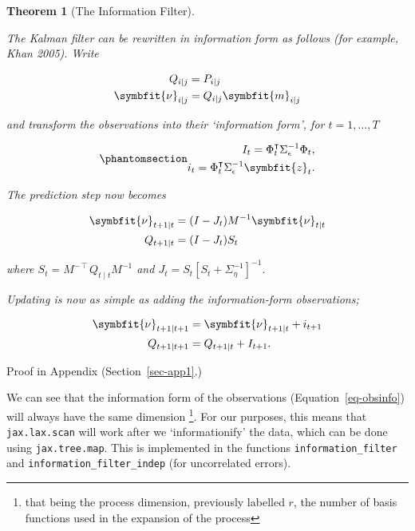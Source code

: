 \documentclass[
]{report}
\newcommand{\bv}[1]{\symbfit{#1}}
\theoremstyle{plain}
\theoremstyle{plain}
\newtheorem{theorem}{Theorem}[section]
\theoremstyle{plain}
\theoremstyle{remark}
\begin{document}
\begin{theorem}[The Information
Filter]\protect\hypertarget{thm-information_filter}{}\label{thm-information_filter}

The Kalman filter can be rewritten in information form as follows (for
example, Khan 2005). Write

\[\begin{split}
Q_{i\mid j} &= P_{i\mid j}\\
\bv\nu_{i\mid j} &= Q_{i\mid j} \bv m_{i\mid j}
\end{split}
\]

and transform the observations into their `information form', for
\(t=1,\dots, T\)

\begin{equation}\phantomsection\label{eq-obsinfo}{\begin{split}
I_{t} = \Phi_{t}^{\intercal} \Sigma_{\epsilon}^{-1}\Phi_{t},\\
i_{t} = \Phi_{t}^{\intercal} \Sigma_{\epsilon}^{-1} \bv z_{t}.
\end{split}
}\end{equation}

The prediction step now becomes

\[\begin{split}
\bv\nu_{t+1\mid t} &= (I-J_t) M^{-1}\bv\nu_{t\mid t}\\
Q_{t+1\mid t} &= (I-J_t) S_{t} 
\end{split}
\]

where \(S_t = M^{-\intercal} Q_{t\mid t} M^{-1}\) and
\(J_t = S_t [S_{t}+\Sigma_{\eta}^{-1}]^{-1}\).

Updating is now as simple as adding the information-form observations;

\[\begin{split}
  \bv\nu_{t+1\mid t+1} &= \bv\nu_{t+1\mid t} + i_{t+1}\\
  Q_{t+1\mid t+1} &= Q_{t+1\mid t} + I_{t+1}.
\end{split}
\]

\end{theorem}

Proof in Appendix (Section~\ref{sec-app1}.)

We can see that the information form of the observations
(Equation~\ref{eq-obsinfo}) will always have the same dimension
\footnote{that being the process dimension, previously labelled \(r\),
  the number of basis functions used in the expansion of the process}.
For our purposes, this means that \texttt{jax.lax.scan} will work after
we `informationify' the data, which can be done using
\texttt{jax.tree.map}. This is implemented in the functions
\texttt{information\_filter} and \texttt{information\_filter\_indep}
(for uncorrelated errors).
\end{document}
